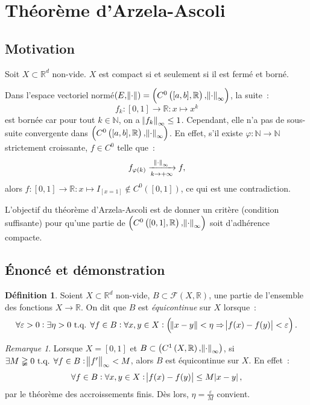 \documentclass{report}
\theoremstyle{definition}
\newtheorem{déf}[thm]{Définition}
\theoremstyle{remark}
\newtheorem*{rmq}{Remarque}
\numberwithin{equation}{section}
\newcommand{\R}{\mathbb R}
\newcommand{\N}{\mathbb N}
\newcommand{\tq}{\text{ t.q. }}
\newcommand{\evfn}[3]{\left(#1\left(#2, #3\right), \norm {\cdot}_{\infty}\right)}
\newcommand{\evnC}[3]{{\evfn {C^{#1}}{#2}{#3}}}
\newcommand{\pinfty}{{+\infty}}
\newcommand{\evn}{espace vectoriel normé}
\begin{document}
	\section{Théorème d'Arzela-Ascoli}
		\subsection{Motivation}
			Soit $X \subset \R^d$ non-vide. $X$ est compact si et seulement si il est fermé et borné.

			Dans l'\evn $(E, \norm \cdot) = \evnC0{[a, b]}\R$, la suite~:
			\begin{equation}
				f_k : [0, 1] \to \R : x \mapsto x^k
			\end{equation}
			est bornée car pour tout $k \in \N$, on a $\norm {f_k}_\infty \leq 1$. Cependant, elle n'a pas de sous-suite convergente dans $\evnC0{[a, b]}\R$.
			En effet, s'il existe $\varphi : \N \to \N$ strictement croissante, $f \in C^0$ telle que~:
			\begin{equation}
				f_{\varphi(k)} \xrightarrow[k \to \pinfty]{\norm \cdot_\infty} f,
			\end{equation}
			alors $f : [0, 1] \to \R : x \mapsto I_{[x=1]} \not \in C^0([0, 1])$, ce qui est une contradiction.

			L'objectif du théorème d'Arzela-Ascoli est de donner un critère (condition suffisante) pour qu'une partie de $\evnC {0}{[0, 1]}{\R}$ soit d'adhérence
			compacte.

		\subsection{Énoncé et démonstration}
			\begin{déf} Soient $X \subset \R^d$ non-vide, $B \subset \mathcal F(X, \R)$, une partie de l'ensemble des fonctions $X \to \R$. On dit que $B$ est
			\textit{équicontinue} sur $X$ lorsque~:
			\begin{equation}
				\forall \varepsilon > 0 : \exists \eta > 0 \tq \forall f \in B : \forall x, y \in X :
				\left(\norm {x-y} < \eta \Rightarrow \abs {f(x)-f(y)} < \varepsilon\right).
			\end{equation}
			\end{déf}

			\begin{rmq} Lorsque $X = [0, 1]$ et $B \subset \evnC1X\R$, si $\exists M \gneqq 0 \tq \forall f \in B : \norm {f'}_\infty < M$, alors $B$ est
			équicontinue sur $X$. En effet~:
			\begin{equation}
				\forall f \in B : \forall x, y \in X : \abs {f(x)-f(y)} \leq M\abs {x-y},
			\end{equation}
			par le théorème des accroissements finis. Dès lors, $\eta = \frac \varepsilon M$ convient.
			\end{rmq}
\end{document}
